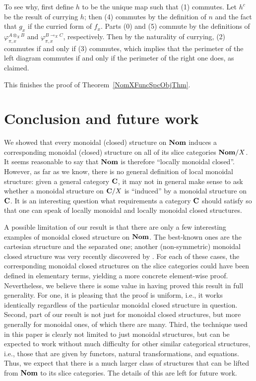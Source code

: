 \documentclass[11pt,a4paper]{amsart}
\theoremstyle{plain}
\theoremstyle{definition}
\theoremstyle{remark}
\newcommand{\Nom}{\textrm{\bf Nom}}
\newcommand{\Cc}{\textrm{\bf{C}}}
\newcommand{\nn}{n}
\newcommand{\eqfams}[3]{\varphi^{#1}_{#2,#3}}
\begin{document}
To see why, first define $h$ to be the unique map such that (1)
commutes. Let $h^c$ be the result of currying $h$; then (4) commutes
by the definition of $\nn$ and the fact that $g_x$ if the curried form
of $f_x$. Parts (0) and (5) commute by the definitions of
$\eqfams{A\otimes_X B}{\pi}{x}$ and $\eqfams{B\multimap_X C}{\pi}{x}$,
respectively. Then by the naturality of currying, (2) commutes if and
only if (3) commutes, which implies that the perimeter of the left
diagram commutes if and only if the perimeter of the right one does,
as claimed.

This finishes the proof of Theorem~\ref{NomXFuncSpcObjThm}.


\section{Conclusion and future work}

We showed that every monoidal (closed) structure on $\Nom$ induces a
corresponding monoidal (closed) structure on all of its slice
categories $\Nom/X$. It seems reasonable to say that $\Nom$ is
therefore ``locally monoidal closed''. However, as far as we know,
there is no general definition of local monoidal structure: given a
general category $\Cc$, it may not in general make sense to ask
whether a monoidal structure on $\Cc/X$ is ``induced'' by a monoidal
structure on $\Cc$. It is an interesting question what requirements a
category $\Cc$ should satisfy so that one can speak of locally
monoidal and locally monoidal closed structures.

A possible limitation of our result is that there are only a few
interesting examples of monoidal closed structure on $\Nom$. The
best-known ones are the cartesian structure and the separated one;
another (non-symmetric) monoidal closed structure was very recently
discovered by \cite{lenke2026}. For each of these cases, the
corresponding monoidal closed structures on the slice categories could
have been defined in elementary terms, yielding a more concrete
element-wise proof. Nevertheless, we believe there is some value in
having proved this result in full generality. For one, it is pleasing
that the proof is uniform, i.e., it works identically regardless of
the particular monoidal closed structure in question. Second, part of
our result is not just for monoidal closed structures, but more
generally for monoidal ones, of which there are many. Third, the
technique used in this paper is clearly not limited to just monoidal
structures, but can be expected to work without much difficulty for
other similar categorical structures, i.e., those that are given by
functors, natural transformations, and equations. Thus, we expect that
there is a much larger class of structures that can be lifted from
$\Nom$ to its slice categories. The details of this are left for
future work.
\end{document}
